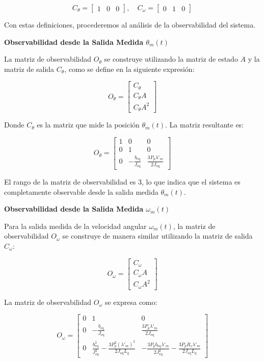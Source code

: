\documentclass{article}
\begin{document}
\[
C_{\theta} = \begin{bmatrix}
1 & 0 & 0
\end{bmatrix}, \quad
C_{\omega} = \begin{bmatrix}
0 & 1 & 0
\end{bmatrix}
\]

Con estas definiciones, procederemos al análisis de la observabilidad del sistema.

\textbf{Observabilidad desde la Salida Medida $\theta_m(t)$}

La matriz de observabilidad \( O_{\theta} \) se construye utilizando la matriz de estado \( A \) y la matriz de salida \( C_{\theta} \), como se define en la siguiente expresión:

\[
O_{\theta} = \begin{bmatrix}
C_{\theta} \\
C_{\theta} A \\
C_{\theta} A^2
\end{bmatrix}
\]

Donde \( C_{\theta} \) es la matriz que mide la posición \(\theta_m(t)\). La matriz resultante es:

\[
O_{\theta} = \begin{bmatrix}
1 & 0 & 0 \\
0 & 1 & 0 \\
0 & -\frac{b_{\text{eq}}}{J_{\text{eq}}} & \frac{3 P_{p} \lambda'_{m}}{2 J_{\text{eq}}}
\end{bmatrix}
\]

El rango de la matriz de observabilidad es 3, lo que indica que el sistema es completamente observable desde la salida medida \(\theta_m(t)\).

\textbf{Observabilidad desde la Salida Medida $\omega_m(t)$}

Para la salida medida de la velocidad angular \(\omega_m(t)\), la matriz de observabilidad \( O_{\omega} \) se construye de manera similar utilizando la matriz de salida \( C_{\omega} \):

\[
O_{\omega} = \begin{bmatrix}
C_{\omega} \\
C_{\omega} A \\
C_{\omega} A^2
\end{bmatrix}
\]

La matriz de observabilidad \( O_{\omega} \) se expresa como:

\[
O_{\omega} = \begin{bmatrix}
0 & 1 & 0 \\
0 & -\frac{b_{\text{eq}}}{J_{\text{eq}}} & \frac{3 P_{p} \lambda'_{m}}{2 J_{\text{eq}}} \\
0 & \frac{b_{\text{eq}}^2}{J_{\text{eq}}^2} - \frac{3 P_{p}^2 (\lambda'_{m})^2}{2 J_{\text{eq}} L_q} & -\frac{3 P_{p} b_{\text{eq}} \lambda'_{m}}{2 J_{\text{eq}}^2} - \frac{3 P_{p} R_s \lambda'_{m}}{2 J_{\text{eq}} L_q}
\end{bmatrix}
\]
\end{document}
